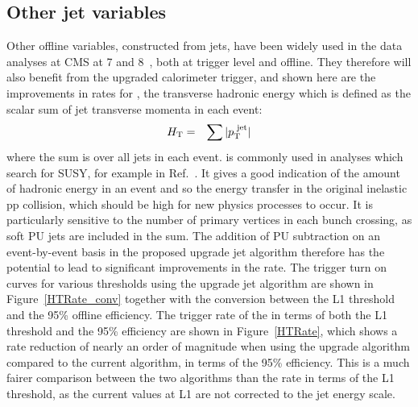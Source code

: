 \subsection{Other jet variables}
Other offline variables, constructed from jets, have been widely used in the data analyses at \ac{CMS} at 7 and 8~\TeV, both at trigger level and offline.
They therefore will also benefit from the upgraded calorimeter trigger, and shown here are the improvements in rates for \HT, the transverse hadronic energy which is defined as the scalar sum of jet transverse momenta in each event:
%
\begin{eqnarray}
\HT &=& \sum{|\pt^{\text{ jet}}|} %
\end{eqnarray}  
where the sum is over all jets in each event.
\HT is commonly used in analyses which search for \ac{SUSY}, for example in Ref.~\cite{alphaT}.
It gives a good indication of the amount of hadronic energy in an event and so the energy transfer in the original inelastic pp collision, which should be high for new physics processes to occur.
It is particularly sensitive to the number of primary vertices in each bunch crossing, as soft \ac{PU} jets are included in the sum.
The addition of \ac{PU} subtraction on an event-by-event basis in the proposed upgrade jet algorithm therefore has the potential to lead to significant improvements in the rate.
The trigger turn on curves for various \HT thresholds using the upgrade jet algorithm are shown in Figure~\ref{HTRate_conv} together with the conversion between the \ac{L1} threshold and the 95\% offline efficiency. 
The trigger rate of the \HT in terms of both the \ac{L1} threshold and the 95\% efficiency are shown in Figure~\ref{HTRate}, which shows a rate reduction of nearly an order of magnitude when using the upgrade algorithm compared to the current algorithm, in terms of the 95\% efficiency. 
This is a much fairer comparison between the two algorithms than the rate in terms of the \ac{L1} threshold, as the current \HT {} values at \ac{L1} are not corrected to the jet energy scale.


